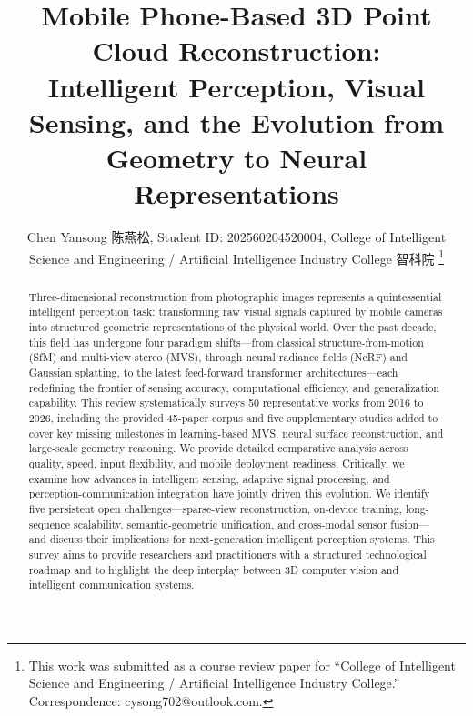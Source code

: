 \documentclass[journal]{IEEEtran}
\begin{document}
\title{Mobile Phone-Based 3D Point Cloud Reconstruction:\\Intelligent Perception, Visual Sensing, and the Evolution from Geometry to Neural Representations}

\author{Chen Yansong 陈燕松, 
Student ID: 202560204520004, 
College of Intelligent Science and Engineering / Artificial Intelligence Industry College 智科院%
\thanks{This work was submitted as a course review paper for ``College of Intelligent Science and Engineering / Artificial Intelligence Industry College.'' Correspondence: cysong702@outlook.com.}}

\maketitle

\begin{abstract}
Three-dimensional reconstruction from photographic images represents a quintessential intelligent perception task: transforming raw visual signals captured by mobile cameras into structured geometric representations of the physical world. Over the past decade, this field has undergone four paradigm shifts---from classical structure-from-motion (SfM) and multi-view stereo (MVS), through neural radiance fields (NeRF) and Gaussian splatting, to the latest feed-forward transformer architectures---each redefining the frontier of sensing accuracy, computational efficiency, and generalization capability. This review systematically surveys 50 representative works from 2016 to 2026, including the provided 45-paper corpus and five supplementary studies added to cover key missing milestones in learning-based MVS, neural surface reconstruction, and large-scale geometry reasoning. We provide detailed comparative analysis across quality, speed, input flexibility, and mobile deployment readiness. Critically, we examine how advances in intelligent sensing, adaptive signal processing, and perception-communication integration have jointly driven this evolution. We identify five persistent open challenges---sparse-view reconstruction, on-device training, long-sequence scalability, semantic-geometric unification, and cross-modal sensor fusion---and discuss their implications for next-generation intelligent perception systems. This survey aims to provide researchers and practitioners with a structured technological roadmap and to highlight the deep interplay between 3D computer vision and intelligent communication systems.
\end{abstract}
\end{document}
